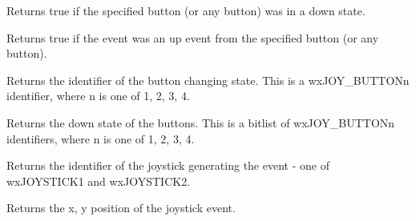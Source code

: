\label{wxjoystickeventbuttonisdown}


Returns true if the specified button (or any button) was in a down state.



\label{wxjoystickeventbuttonup}


Returns true if the event was an up event from the specified button (or any button).



\label{wxjoystickeventgetbuttonchange}


Returns the identifier of the button changing state. This is a wxJOY\_BUTTONn identifier, where
n is one of 1, 2, 3, 4.

\label{wxjoystickeventgetbuttonstate}


Returns the down state of the buttons. This is a bitlist of wxJOY\_BUTTONn identifiers, where
n is one of 1, 2, 3, 4.

\label{wxjoystickeventgetjoystick}


Returns the identifier of the joystick generating the event - one of wxJOYSTICK1 and wxJOYSTICK2.

\label{wxjoystickeventgetposition}


Returns the x, y position of the joystick event.

\label{wxjoystickeventgetzposition}

